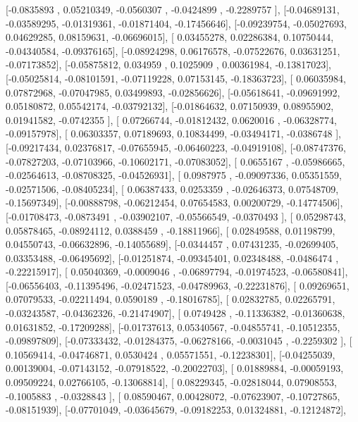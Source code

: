 \documentclass{article}
\begin{document}
       [-0.0835893 ,  0.05210349, -0.0560307 , -0.0424899 , -0.2289757 ],
       [-0.04689131, -0.03589295, -0.01319361, -0.01871404, -0.17456646],
       [-0.09239754, -0.05027693,  0.04629285,  0.08159631, -0.06696015],
       [ 0.03455278,  0.02286384,  0.10750444, -0.04340584, -0.09376165],
       [-0.08924298,  0.06176578, -0.07522676,  0.03631251, -0.07173852],
       [-0.05875812,  0.034959  ,  0.1025909 ,  0.00361984, -0.13817023],
       [-0.05025814, -0.08101591, -0.07119228,  0.07153145, -0.18363723],
       [ 0.06035984,  0.07872968, -0.07047985,  0.03499893, -0.02856626],
       [-0.05618641, -0.09691992,  0.05180872,  0.05542174, -0.03792132],
       [-0.01864632,  0.07150939,  0.08955902,  0.01941582, -0.0742355 ],
       [ 0.07266744, -0.01812432,  0.0620016 , -0.06328774, -0.09157978],
       [ 0.06303357,  0.07189693,  0.10834499, -0.03494171, -0.0386748 ],
       [-0.09217434,  0.02376817, -0.07655945, -0.06460223, -0.04919108],
       [-0.08747376, -0.07827203, -0.07103966, -0.10602171, -0.07083052],
       [ 0.0655167 , -0.05986665, -0.02564613, -0.08708325, -0.04526931],
       [ 0.0987975 , -0.09097336,  0.05351559, -0.02571506, -0.08405234],
       [ 0.06387433,  0.0253359 , -0.02646373,  0.07548709, -0.15697349],
       [-0.00888798, -0.06212454,  0.07654583,  0.00200729, -0.14774506],
       [-0.01708473, -0.0873491 , -0.03902107, -0.05566549, -0.0370493 ],
       [ 0.05298743,  0.05878465, -0.08924112,  0.0388459 , -0.18811966],
       [ 0.02849588,  0.01198799,  0.04550743, -0.06632896, -0.14055689],
       [-0.0344457 ,  0.07431235, -0.02699405,  0.03353488, -0.06495692],
       [-0.01251874, -0.09345401,  0.02348488, -0.0486474 , -0.22215917],
       [ 0.05040369, -0.0009046 , -0.06897794, -0.01974523, -0.06580841],
       [-0.06556403, -0.11395496, -0.02471523, -0.04789963, -0.22231876],
       [ 0.09269651,  0.07079533, -0.02211494,  0.0590189 , -0.18016785],
       [ 0.02832785,  0.02265791, -0.03243587, -0.04362326, -0.21474907],
       [ 0.0749428 , -0.11336382, -0.01360638,  0.01631852, -0.17209288],
       [-0.01737613,  0.05340567, -0.04855741, -0.10512355, -0.09897809],
       [-0.07333432, -0.01284375, -0.06278166, -0.0031045 , -0.2259302 ],
       [ 0.10569414, -0.04746871,  0.0530424 ,  0.05571551, -0.12238301],
       [-0.04255039,  0.00139004, -0.07143152, -0.07918522, -0.20022703],
       [ 0.01889884, -0.00059193,  0.09509224,  0.02766105, -0.13068814],
       [ 0.08229345, -0.02818044,  0.07908553, -0.1005883 , -0.0328843 ],
       [ 0.08590467,  0.00428072, -0.07623907, -0.10727865, -0.08151939],
       [-0.07701049, -0.03645679, -0.09182253,  0.01324881, -0.12124872],
\end{document}
